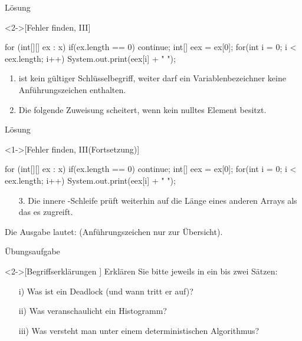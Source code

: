 \begin{frame}[c,fragile]{Lösung}
    \begin{solve}<2->[Fehler finden, III]
        \pause{}\begin{plainjava}
for (int[][] ex : x) {
    if(ex.length == 0) continue;
    int[] eex = ex[0];
    for(int i = 0; i < eex.length; i++)
        System.out.print(eex[i] + " ");
}
        \end{plainjava}
    \begin{enumerate}[<+(1)->]
        \item {} ist kein gültiger Schlüsselbegriff, weiter darf ein Variablen\-be\-zei\-chner keine Anführungszeichen enthalten.
        \item Die folgende Zuweisung scheitert, wenn  kein nulltes Element besitzt.
    \end{enumerate}
    \end{solve}
\end{frame}

\begin{frame}[c,fragile]{Lösung}
    \addtocounter{solve}{-1}
    \begin{solve}<1->[Fehler finden, III\hfill(Fortsetzung)]
        \begin{plainjava}
for (int[][] ex : x) {
    if(ex.length == 0) continue;
    int[] eex = ex[0];
    for(int i = 0; i < eex.length; i++)
        System.out.print(eex[i] + " ");
}
        \end{plainjava}
    \begin{enumerate}[<+(1)->]
        \item[3.] Die innere -Schleife prüft weiterhin auf die Länge eines anderen Arrays als das es zugreift.
    \end{enumerate}
    \pause{}Die Ausgabe lautet:\pause{}  (Anführungszeichen nur zur Übersicht).
    \end{solve}
\end{frame}


\begin{frame}[c]{Übungsaufgabe}
    \begin{exercise}<2->[Begriffserklärungen ]
        \pause{}Erklären Sie bitte jeweils in ein bis zwei Sätzen: \begin{enumerate}[<+(1)->]
            \item[i)] Was ist ein Deadlock (und wann tritt er auf)?
            \item[ii)] Was veranschaulicht ein Histogramm?
            \item[iii)] Was versteht man unter einem deterministischen Algorithmus?
        \end{enumerate}
    \end{exercise}
\end{frame}

